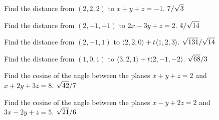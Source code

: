 \endlist
\endexercise

\exercise Find the distance from $(2,2,2)$ to $x+y+z=-1$.
\answer $\displaystyle 7/\sqrt3$
\endanswer
\endexercise

\exercise Find the distance from $(2,-1,-1)$ to $2x-3y+z=2$.
\answer $\displaystyle 4/\sqrt{14}$
\endanswer
\endexercise

\exercise Find the distance from $(2,-1,1)$ to 
$\langle 2,2,0\rangle+t\langle 1,2,3\rangle$.
\answer $\displaystyle \sqrt{131}/\sqrt{14}$
\endanswer
\endexercise

\exercise Find the distance from $(1,0,1)$ to 
$\langle 3,2,1\rangle+t\langle 2,-1,-2\rangle$.
\answer $\displaystyle \sqrt{68}/3$
\endanswer
\endexercise

\exercise Find the cosine of the angle
between the planes $x+y+z=2$ and $x+2y+3z=8$.
\answer $\displaystyle \sqrt{42}/7$
\endanswer
\endexercise

\exercise Find the cosine of the angle
between the planes $x-y+2z=2$ and $3x-2y+z=5$.
\answer $\displaystyle \sqrt{21}/6$
\endanswer
\endexercise

\endexercises

